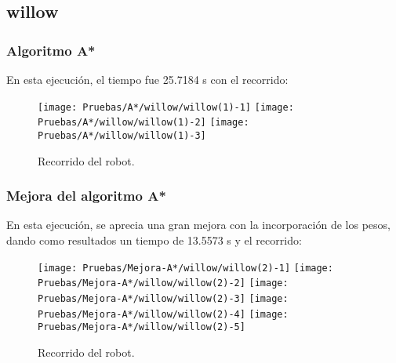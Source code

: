 \documentclass[a4paper, 11pt]{article}
\begin{document}
	\subsection{willow}
		\subsubsection{Algoritmo A*}
			En esta ejecución, el tiempo fue 25.7184 s con el recorrido:
			\begin{figure}[H]
				\centering
				\texttt{[image: Pruebas/A*/willow/willow(1)-1]}
				\texttt{[image: Pruebas/A*/willow/willow(1)-2]}
				\texttt{[image: Pruebas/A*/willow/willow(1)-3]}
				\caption{Recorrido del robot.}
				\label{A-wil}
			\end{figure}
			
		\subsubsection{Mejora del algoritmo A*}
			En esta ejecución, se aprecia una gran mejora con la incorporación de los pesos, dando como
			resultados un tiempo de 13.5573 s y el recorrido: 
			
			\begin{figure}[H]
				\centering
				\texttt{[image: Pruebas/Mejora-A*/willow/willow(2)-1]}
				\texttt{[image: Pruebas/Mejora-A*/willow/willow(2)-2]}
				\texttt{[image: Pruebas/Mejora-A*/willow/willow(2)-3]}
				\texttt{[image: Pruebas/Mejora-A*/willow/willow(2)-4]}
				\texttt{[image: Pruebas/Mejora-A*/willow/willow(2)-5]}
				\caption{Recorrido del robot.}
				\label{MA-wil}
			\end{figure}
	
\end{document}
